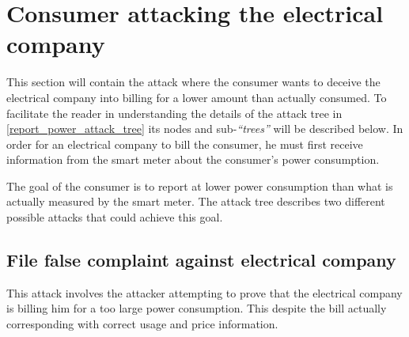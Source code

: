 
\section{Consumer attacking the electrical company}\label{attacks:consumer_vs_electrical}
This section will contain the attack where the consumer wants to deceive the electrical company into billing for a lower amount than actually consumed.
To facilitate the reader in understanding the details of the attack tree in \cref{report_power_attack_tree} its nodes and sub-\emph{``trees''} will be described below.
In order for an electrical company to bill the consumer, he must first receive information from the smart meter about the consumer's power consumption.

The goal of the consumer is to report at lower power consumption than what is actually measured by the smart meter.
The attack tree describes two different possible attacks that could achieve this goal.



\subsection{File false complaint against electrical company}
This attack involves the attacker attempting to prove that the electrical company is billing him for a too large power consumption.
This despite the bill actually corresponding with correct usage and price information.

